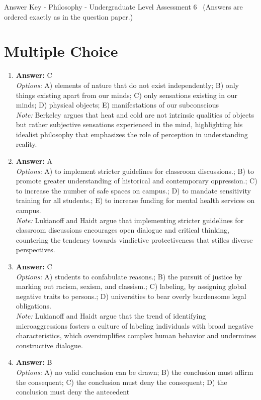 \documentclass[12pt]{article}
\begin{document}
\begin{center}
Answer Key - Philosophy - Undergraduate Level Assessment 6 \
\small (Answers are ordered exactly as in the question paper.)
\end{center}

\section*{Multiple Choice}
\begin{enumerate}[label=\arabic*.]
\item \textbf{Answer:} C
\\ \textit{Options:} A) elements of nature that do not exist independently; B) only things existing apart from our minds; C) only sensations existing in our minds; D) physical objects; E) manifestations of our subconscious
\\ \textit{Note:} Berkeley argues that heat and cold are not intrinsic qualities of objects but rather subjective sensations experienced in the mind, highlighting his idealist philosophy that emphasizes the role of perception in understanding reality.
\item \textbf{Answer:} A
\\ \textit{Options:} A) to implement stricter guidelines for classroom discussions.; B) to promote greater understanding of historical and contemporary oppression.; C) to increase the number of safe spaces on campus.; D) to mandate sensitivity training for all students.; E) to increase funding for mental health services on campus.
\\ \textit{Note:} Lukianoff and Haidt argue that implementing stricter guidelines for classroom discussions encourages open dialogue and critical thinking, countering the tendency towards vindictive protectiveness that stifles diverse perspectives.
\item \textbf{Answer:} C
\\ \textit{Options:} A) students to confabulate reasons.; B) the pursuit of justice by marking out racism, sexism, and classism.; C) labeling, by assigning global negative traits to persons.; D) universities to bear overly burdensome legal obligations.
\\ \textit{Note:} Lukianoff and Haidt argue that the trend of identifying microaggressions fosters a culture of labeling individuals with broad negative characteristics, which oversimplifies complex human behavior and undermines constructive dialogue.
\item \textbf{Answer:} B
\\ \textit{Options:} A) no valid conclusion can be drawn; B) the conclusion must affirm the consequent; C) the conclusion must deny the consequent; D) the conclusion must deny the antecedent

\end{enumerate}
\end{document}
